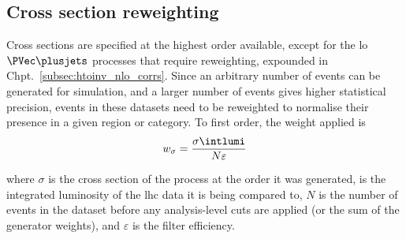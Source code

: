 

\subsection{Cross section reweighting}
\label{subsec:xs_weighting}

Cross sections are specified at the highest order available, except for the \acrshort{lo} $\PVec \plusjets$ processes that require reweighting, expounded in Chpt.~\ref{subsec:htoinv_nlo_corrs}. Since an arbitrary number of events can be generated for simulation, and a larger number of events gives higher statistical precision, events in these datasets need to be reweighted to normalise their presence in a given region or category. To first order, the weight applied is
\begin{equation}
    w_{\sigma} = \frac{ \sigma \intlumi }{ N \varepsilon }
    \label{eq:xs_weight}
\end{equation}

where $\sigma$ is the cross section of the process at the order it was generated, \intlumi is the integrated luminosity of the \acrshort{lhc} data it is being compared to, $N$ is the number of events in the dataset before any analysis-level cuts are applied (or the sum of the generator weights), and $\varepsilon$ is the filter efficiency.


